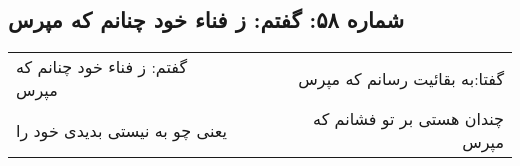 \begin{center}
\section*{شماره ۵۸: گفتم: ز فناء خود چنانم که مپرس}
\label{sec:058}
\begin{longtable}{l p{0.5cm} r}
گفتم: ز فناء خود چنانم که مپرس
&&
گفتا:‌به بقائیت رسانم که مپرس
\\
یعنی چو به نیستی بدیدی خود را
&&
چندان هستی بر تو فشانم که مپرس
\\
\end{longtable}
\end{center}
